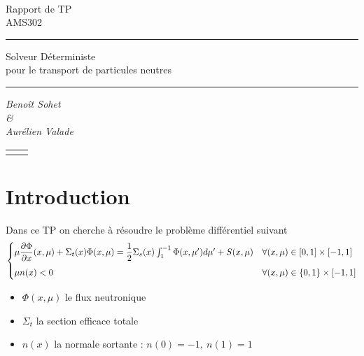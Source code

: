 \documentclass[11pt,a4paper]{article}
\newcommand{\dx}[1]{\dfrac{\partial #1}{\partial x}}
\begin{document}
\begin{titlepage}
  ~\vspace{90pt}
  \centering \bfseries

  \huge Rapport de TP \\AMS302

  \vspace{50pt}
  \rule{0.5\textwidth}{1pt}
  \vspace{50pt}

  \Huge Solveur Déterministe \\ pour le transport de particules neutres

  \vspace{50pt}
  \rule{0.5\textwidth}{1pt}

  \vspace{50pt}
  \huge {\itshape Benoît Sohet \\ \& \\ Aurélien Valade}

  \vfill
  \begin{tabular}{cc}
    \begin{minipage}{.49\textwidth}
      \centering
    \end{minipage}
    &
      \begin{minipage}{.49\textwidth}
        \centering
      \end{minipage}
  \end{tabular}

\end{titlepage}

\newpage

\section*{Introduction}

Dans ce TP on cherche à résoudre le problème différentiel suivant 
\begin{equation}
  \label{eq:principal}
  \begin{cases}
    \mu \dx{\Phi}(x, \mu) + \Sigma_t(x) \Phi(x, \mu) =
    \dfrac{1}{2} \Sigma_s(x) \int_1^{-1} \Phi(x, \mu') d\mu' + S(x, \mu) & \forall (x, \mu) \in [0,1]\times[-1,1]  \medskip\\ 
    \mu n(x) < 0  & \forall (x, \mu) \in \{0,1\}\times[-1,1] 
  \end{cases}
\end{equation}

\begin{itemize}
\item $\Phi(x, \mu)$ le flux neutronique
\item $\Sigma_t$ la section efficace totale 
\item $n(x)$ la normale sortante : $n(0) = -1, ~ n(1) = 1$
\end{itemize}
\end{document}
